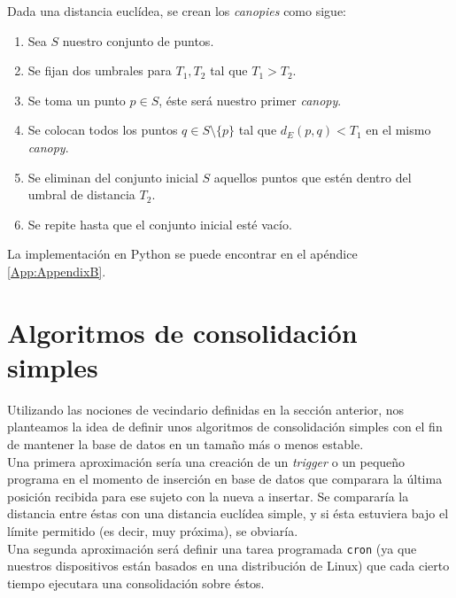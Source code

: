 \documentclass[a4paper, 12pt]{article}
\begin{document}
Dada una distancia eucl\'idea, se crean los \textit{canopies} como sigue:\\

\begin{enumerate}
	\item Sea $S$ nuestro conjunto de puntos.
	\item Se fijan dos umbrales para $T_1, T_2$ tal que $T_1 > T_2$. 
	\item Se toma un punto $p\in S$, \'este ser\'a nuestro primer \textit{canopy}.
	\item Se colocan todos los puntos $q\in S\setminus\{p\}$ tal que $d_E(p, q) < T_1$ en el mismo \textit{canopy}. 
	\item Se eliminan del conjunto inicial $S$ aquellos puntos que est\'en dentro del umbral de distancia $T_2$.
	\item Se repite hasta que el conjunto inicial est\'e vac\'io.
\end{enumerate}

La implementaci\'on\cite{canopyGitHub} en Python se puede encontrar en el ap\'endice \ref{App:AppendixB}.\\

\pagebreak
\section{Algoritmos de consolidaci\'on simples}\label{sec:simple}

Utilizando las nociones de vecindario definidas en la secci\'on anterior, nos planteamos la idea de definir unos algoritmos de consolidaci\'on simples con el fin de mantener la base de datos en un tama\~no m\'as o menos estable. \\

Una primera aproximaci\'on ser\'ia una creaci\'on de un \textit{trigger} o un peque\~no programa en el momento de inserci\'on en base de datos que comparara la \'ultima posici\'on recibida para ese sujeto con la nueva a insertar. Se comparar\'ia la distancia entre \'estas con una distancia eucl\'idea simple, y si \'esta estuviera bajo el l\'imite permitido (es decir, muy pr\'oxima), se obviar\'ia. \\

Una segunda aproximaci\'on ser\'a definir una tarea programada \texttt{cron} (ya que nuestros dispositivos est\'an basados en una distribuci\'on de Linux) que cada cierto tiempo ejecutara una consolidaci\'on sobre \'estos. \\
\end{document}
